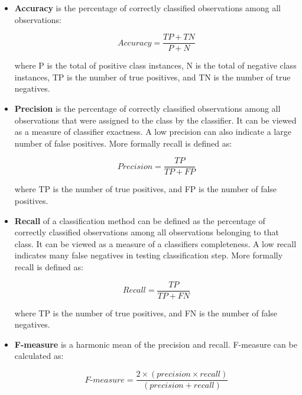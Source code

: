 \begin{itemize}
  \item \textbf{Accuracy} is the percentage of correctly classified observations among all observations:
  
  \begin{equation}
  Accuracy = \frac{TP+TN}{P+N}
  \end{equation}
  
  where P is the total of positive class instances, N is the total of negative class instances, TP is the number of true positives, and TN is the number of true negatives.
  
  \item \textbf{Precision} is the percentage of correctly classified observations among all observations that were assigned to the class by the classifier. It can be viewed as a measure of classifier exactness. A low precision can also indicate a large number of false positives. More formally recall is defined as:
  
  \begin{equation}
  Precision = \frac{TP}{TP+FP}
  \end{equation}
  
  where TP is the number of true positives, and FP is the number of false positives.
  
  \item \textbf{Recall} of a classification method can be defined as the percentage of correctly classified observations among all observations belonging to that class. It can be viewed as a measure of a classifiers completeness. A low recall indicates many false negatives in testing classification step. More formally recall is defined as: 
  
  \begin{equation}
  Recall = \frac{TP}{TP+FN}
  \end{equation}
  
  where TP is the number of true positives, and FN is the number of false negatives.
  
  \item \textbf{F-measure} is a harmonic mean of the precision and recall\cite{Feldman:2006}. F-measure can be calculated as:
  
  \begin{equation}
  \textit{F-measure} = \frac{2 \times (precision \times recall)}{(precision + recall)}
  \end{equation}
  
\end{itemize}

